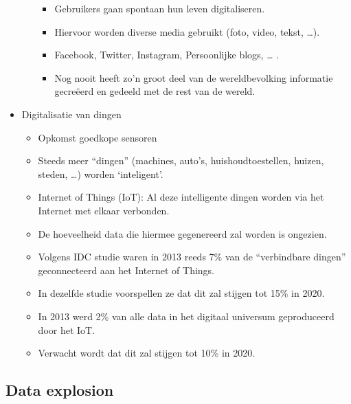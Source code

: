 \documentclass[]{tufte-book}
\providecommand{\tightlist}{%
  \setlength{\itemsep}{0pt}\setlength{\parskip}{0pt}}
\begin{document}
\begin{itemize}
\begin{itemize}
    \begin{itemize}
    \tightlist
    \item
      Gebruikers gaan spontaan hun leven digitaliseren.
    \item
      Hiervoor worden diverse media gebruikt (foto, video, tekst, \ldots).
    \item
      Facebook, Twitter, Instagram, Persoonlijke blogs, \ldots{} .
    \item
      Nog nooit heeft zo'n groot deel van de wereldbevolking informatie gecreëerd en gedeeld met de rest van de wereld.
    \end{itemize}
  \end{itemize}
\item
  Digitalisatie van dingen

  \begin{itemize}
  \tightlist
  \item
    Opkomst goedkope sensoren
  \item
    Steeds meer ``dingen'' (machines, auto's, huishoudtoestellen, huizen, steden, \ldots) worden `inteligent'.
  \item
    Internet of Things (IoT): Al deze intelligente dingen worden via het Internet met elkaar verbonden.
  \item
    De hoeveelheid data die hiermee gegenereerd zal worden is ongezien.
  \item
    Volgens IDC studie waren in 2013 reeds 7\% van de ``verbindbare dingen'' geconnecteerd aan het Internet of Things.
  \item
    In dezelfde studie voorspellen ze dat dit zal stijgen tot 15\% in 2020.
  \item
    In 2013 werd 2\% van alle data in het digitaal universum geproduceerd door het IoT.
  \item
    Verwacht wordt dat dit zal stijgen tot 10\% in 2020.
  \end{itemize}
\end{itemize}

\hypertarget{data-explosion}{%
\subsection{Data explosion}\label{data-explosion}}
\end{document}
